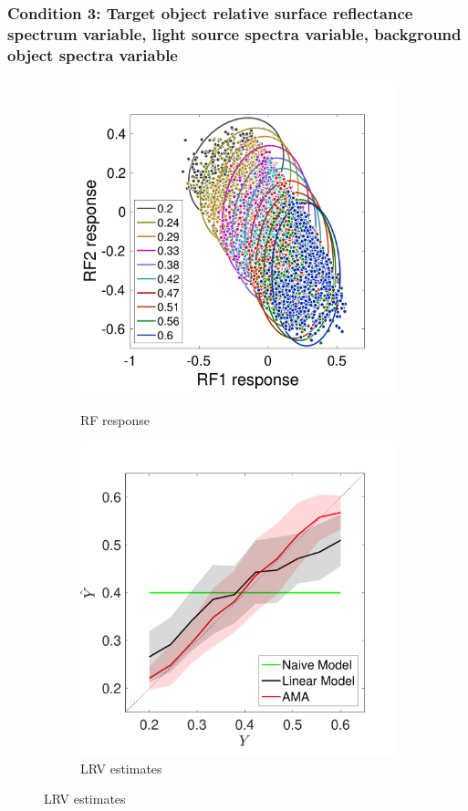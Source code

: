 \documentclass{jov}
\begin{document}
\subsubsection{Condition 3: Target object relative surface reflectance spectrum variable, light source spectra variable, background object spectra variable}
\begin{figure}
\centering
    \begin{subfigure}[b]{0.3 \textwidth}   
        \caption{RF response}
        \includegraphics[width=\textwidth]{../FiguresDraft4/Figure12/Figure12_a.pdf}
        \label{fig:case12FiltersResponse}
    \end{subfigure}    
        \begin{subfigure}[b]{0.3 \textwidth}
        \caption{LRV estimates}
        \includegraphics[width=\textwidth]{../FiguresDraft4/Figure12/Figure12_b.pdf}

\end{subfigure}
\end{figure}
\end{document}
